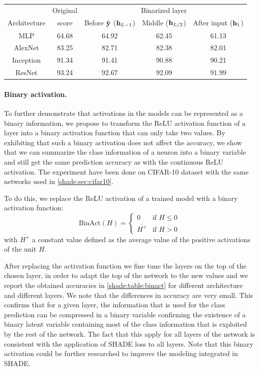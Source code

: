 \begin{table}[tb]
    \centering
    \begin{tabular}{ccccc}
    \toprule
                  & Original & \multicolumn{3}{c}{Binarized layer} \\
    \cmidrule{3-5}
    Architecture &   score   & Before $\hat{\mathbf{y}}$ ($\mathbf{h}_{L-1}$) & Middle ($\mathbf{h}_{L/2}$) & After input ($\mathbf{h}_1$) \\
    \midrule
    MLP       & 64.68 & 64.92 & 62.45 & 61.13\\
    AlexNet   & 83.25 & 82.71 & 82.38 & 82.01\\
    Inception & 91.34 & 91.41 & 90.88 & 90.21 \\
    ResNet    & 93.24 & 92.67 & 92.09 & 91.99 \\
    \bottomrule
    \end{tabular}
    \label{shade:table:binact}
\end{table}

\paragraph{Binary activation.}
To further demonstrate that activations in the models can be represented as a binary information, we propose to transform the \acs{ReLU} activation function of a layer into a binary activation function that can only take two values. By exhibiting that such a binary activation does not affect the accuracy, we show that we can summarize the class information of a neuron into a binary variable and still get the same prediction accuracy as with the continuous \acs{ReLU} activation. The experiment have been done on CIFAR-10 dataset with the same networks used in \autoref{shade:sec:cifar10}. 

To do this, we replace the \acs{ReLU} activation of a trained model with a binary activation function:
\begin{equation}
    \mathrm{BinAct}(H) = \begin{cases}
        0 & \text{if }H \leq 0 \\
        \overline{H^+} & \text{if }H > 0
    \end{cases}
\end{equation}
with $\overline{H^+}$ a constant value defined as the average value of the positive activations of the unit $H$.

After replacing the activation function we fine tune the layers on the top of the chosen layer, in order to adapt the top of the network to the new values and we report the obtained accuracies in \autoref{shade:table:binact} for different architecture and different layers. We note that the differences in accuracy are very small. This confirms that for a given layer, the information that is used for the class prediction can be compressed in a binary variable confirming the existence of a binary latent variable containing most of the class information that is exploited by the rest of the network. The fact that this apply for all layers of the network is consistent with the application of SHADE loss to all layers. Note that this binary activation could be further researched to improve the modeling integrated in \ac{SHADE}.
